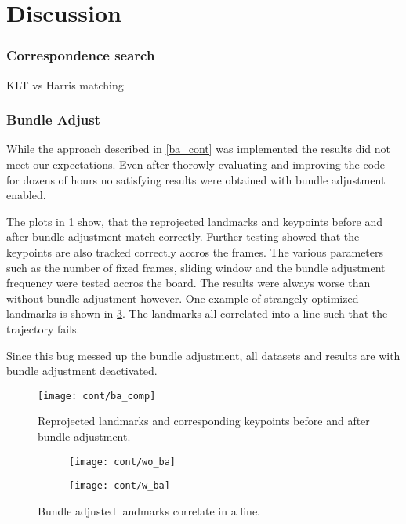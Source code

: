 \section{Discussion}

\subsubsection{Correspondence search}
KLT vs Harris matching

\subsubsection{Bundle Adjust}
While the approach described in \cref{ba_cont} was implemented the results did not meet our expectations. Even after thorowly evaluating and improving the code for dozens of hours no satisfying results were obtained with bundle adjustment enabled.

The plots in \cref{fig:ba_comp} show, that the reprojected landmarks and keypoints before and after bundle adjustment match correctly. Further testing showed that the keypoints are also tracked correctly accros the frames. 
The various parameters such as the number of fixed frames, sliding window and the bundle adjustment frequency were tested accros the board. The results were always worse than without bundle adjustment however.
One example of strangely optimized landmarks is shown in \cref{ba_vs_wo_ba}. The landmarks all correlated into a line such that the trajectory fails.

Since this bug messed up the bundle adjustment, all datasets and results are with bundle adjustment deactivated.

\begin{figure}
	\centering
	\texttt{[image: cont/ba\_comp]}
	\caption{Reprojected landmarks and corresponding keypoints before and after bundle adjustment.}
	\label{fig:ba_comp}
\end{figure}


\begin{figure}
\centering
   \begin{subfigure}[b]{0.55\textwidth}
   \texttt{[image: cont/wo\_ba]}
\end{subfigure}

\begin{subfigure}[b]{0.55\textwidth}
   \texttt{[image: cont/w\_ba]}
   \label{ba_vs_wo_ba}
\end{subfigure}
\caption{Bundle adjusted landmarks correlate in a line.}
\end{figure}




